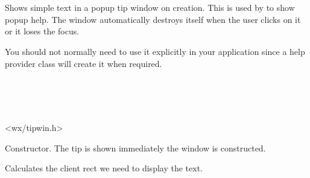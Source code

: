 \section{}\label{wxtipwindow}

Shows simple text in a popup tip window on creation. This is used by  to
show popup help. The window automatically destroys itself when the user clicks on it or it loses
the focus.

You should not normally need to use it explicitly in your application since a help provider class
will create it when required.


\\
\\
\\


<wx/tipwin.h>


\label{wxtipwindowwxtipwindow}


Constructor. The tip is shown immediately the window is constructed.

\label{wxtipwindowadjust}


Calculates the client rect we need to display the text.

